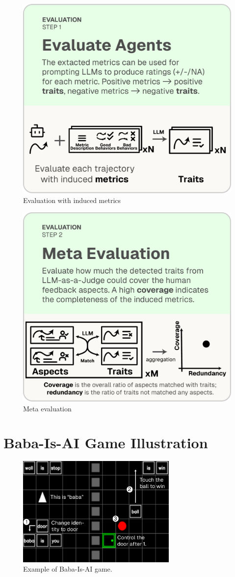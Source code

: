 \documentclass[../main.tex]{subfiles}
\begin{document}
\begin{figure}[!h]
	\includegraphics[width=0.4\linewidth]{figs/autolibra_step_3.pdf}
	\caption{Evaluation with induced metrics}
	\label{fig:llm_as_a_judge}
\end{figure}


\begin{figure}[!h]
	\includegraphics[width=0.4\linewidth]{figs/autolibra_step_4.pdf}
	\caption{Meta evaluation}
	\label{fig:meta_evaluation}
\end{figure}


\section{Baba-Is-AI Game Illustration}
\label{appendix:baba-is-ai}

\begin{figure}[!h]
\centering
\includegraphics[width=0.7\textwidth]{figs/babaisai-self-referential.pdf}
\caption{Example of Baba-Is-AI game.}
\label{fig:baba-is-ai}
\end{figure}
\end{document}

